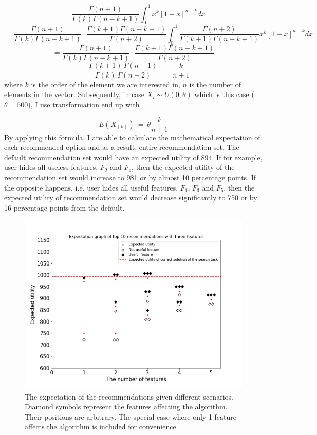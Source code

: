 \documentclass[a4paper,12pt]{article}
\begin{document}
$$
=\frac{\Gamma\left(n+1\right)}{\Gamma\left(k\right)\Gamma\left(n-k+1\right)}\int_{0}^{1}{x^k\left[1-x\right]^{n-k}}dx
$$
$$
=\frac{\Gamma\left(n+1\right)}{\Gamma\left(k\right)\Gamma\left(n-k+1\right)}\cdot\frac{\Gamma\left(k+1\right)\Gamma\left(n-k+1\right)}{\Gamma\left(n+2\right)}\int_{0}^{1}\frac{\Gamma\left(n+2\right)}{\Gamma\left(k+1\right)\Gamma\left(n-k+1\right)}x^k\left[1-x\right]^{n-k}dx
$$
$$
=\frac{\Gamma\left(n+1\right)}{\Gamma\left(k\right)\Gamma\left(n-k+1\right)}\cdot\frac{\Gamma\left(k+1\right)\Gamma\left(n-k+1\right)}{\Gamma\left(n+2\right)}
$$
$$
=\ \frac{\Gamma\left(k+1\right)\ \Gamma\left(n+1\right)}{\Gamma\left(k\right)\ \Gamma\left(n+2\right)}\ =\ \ \frac{k}{n+1}
$$
where $k$ is the order of the element we are interested in, $n$ is the number of elements in the vector. Subsequently, in case $X_i\sim U\left(0,\theta\right)$ which is this case ($\theta = 500$), I use transformation end up with 

$$
E\left(X_{\left(k\right)}\right)\ =\ \theta\frac{k}{n+1}
$$
By applying this formula, I are able to calculate the mathematical expectation of each recommended option and as a result, entire recommendation set. The default recommendation set would have an expected utility of 894. If for example, user hides all useless features, $F_2$ and $F_4$, then the expected utility of the recommendation set would increase to 981 or by almost 10 percentage points. If the opposite happens, i.e. user hides all useful features, $F_1$, $F_3$ and $F_5$, then the expected utility of recommendation set would decrease significantly to 750 or by 16 percentage points from the default.

\begin{figure}
    \centering
    \includegraphics[width=0.8\linewidth]{staticFiles/ThreeFeaturesExpectationTop10SUMutility.png}
    \caption{The expectation of the recommendations given different scenarios. Diamond symbols represent the features affecting the algorithm. Their positions are arbitrary. The special case where only 1 feature affects the algorithm is included for convenience.}
    \label{fig:expectationGraph}
\end{figure}
\end{document}
